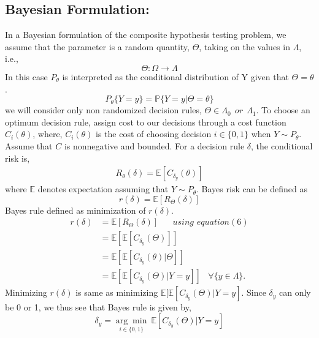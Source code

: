 \documentclass[a4paper,english,12pt]{article}
\begin{document}
\subsection*{Bayesian Formulation:}
In a Bayesian formulation of the composite hypothesis testing problem, we assume that the parameter is a random quantity, $\Theta$, taking on the values in $\Lambda$, i.e.,
\begin{equation}
\Theta : \Omega \to \Lambda 
\end{equation}
In this case $ P_\theta$ is interpreted as the conditional distribution of Y given that $\Theta = \theta$.
\begin{equation}
P_\theta \{ Y = y \} = \mathbb{P} \{ Y=y | \Theta = \theta\} 
\end{equation}
we will consider only non randomized decision rules, $ \Theta \in \Lambda_0~~or~~\Lambda_1$. To choose an optimum decision rule, assign cost to our decisions through a cost function $ C_i (\theta)$, where, $ C_i (\theta)$ is the cost of choosing decision $i \in \{0,1\}$ when $Y \sim P_\theta$. Assume that $C$ is nonnegative and bounded. For a decision rule $\delta$, the conditional risk is,
\begin{eqnarray}
R_\theta (\delta) = \mathbb{E} [ C_{ \delta_y } (\theta)]
\end{eqnarray}
where $\mathbb{E}$ denotes expectation assuming that $ Y \sim P_\theta$. Bayes risk can be defined as 
\begin{equation}
r(\delta) = \mathbb{E} [ R_\Theta (\delta)]
\end{equation}
Bayes rule defined as minimization of $r(\delta)$.
\begin{align}
r(\delta) &= \mathbb{E} [ R_\Theta (\delta)]\hspace{20pt}{using\,\, equation(6)}\\\nonumber
&= \mathbb{E}[\mathbb{E}[ C_{ \delta_y } (\Theta)]]\\\nonumber
&= \mathbb{E}[\mathbb{E}[ C_{ \delta_y } (\theta) | \Theta ]]\\\nonumber
&= \mathbb{E}[\mathbb{E}[ C_{ \delta_y } (\Theta) | Y=y ]]\hspace{10pt} \forall \{ y \in \Lambda \}.
\end{align}
Minimizing $r(\delta)$ is same as minimizing $\mathbb{E}[\mathbb{E}[ C_{ \delta_y } (\Theta) | Y=y ]$. Since $\delta_y $ can only be 0 or 1, we thus see that Bayes rule is given by, 
\begin{equation}
\delta_y = \underset{i \in \{0,1\}}{\arg\min}~\mathbb{E}[C_{ \delta_y } (\Theta) | Y=y]
\end{equation}
\end{document}
